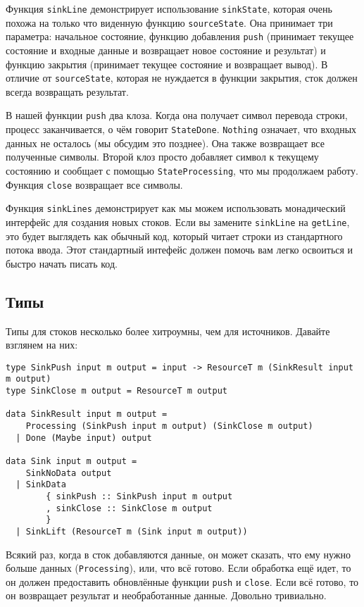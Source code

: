 {Функция \lstinline=sinkLine= демонстрирует использование \lstinline=sinkState=, которая
очень похожа на только что
виденную функцию \lstinline=sourceState=. Она принимает три параметра: начальное
состояние,
функцию добавления \verb=push= 
(принимает текущее состояние и входные данные и возвращает новое состояние и результат)
и функцию закрытия (принимает текущее состояние и возвращает вывод).
В отличие от \lstinline=sourceState=, которая не нуждается в функции закрытия, сток
должен всегда возвращать результат.

В нашей функции \lstinline=push= два клоза. Когда она получает символ перевода строки,
процесс заканчивается, о чём говорит \lstinline=StateDone=. \lstinline=Nothing= означает,
что
входных данных не
осталось (мы обсудим это позднее). Она также возвращает все полученные символы. Второй
клоз просто добавляет символ к текущему состоянию и сообщает с помощью
\lstinline=StateProcessing=, что мы продолжаем работу.
Функция \lstinline=close= возвращает все символы.

Функция \lstinline=sinkLines= демонстрирует как мы можем использовать монадический
интерфейс для создания новых стоков. Если вы замените \lstinline=sinkLine= на
\lstinline=getLine=, это будет выглядеть
как обычный код, который читает строки из стандартного потока ввода. Этот
стандартный интефейс должен помочь вам легко освоиться и быстро начать писать код.

\subsection{Типы}

Типы для стоков несколько более хитроумны, чем для источников. Давайте взглянем на них:
\begin{lstlisting}
type SinkPush input m output = input -> ResourceT m (SinkResult input m output)
type SinkClose m output = ResourceT m output

data SinkResult input m output =
    Processing (SinkPush input m output) (SinkClose m output)
  | Done (Maybe input) output

data Sink input m output =
    SinkNoData output
  | SinkData
        { sinkPush :: SinkPush input m output
        , sinkClose :: SinkClose m output
        }
  | SinkLift (ResourceT m (Sink input m output))
\end{lstlisting}  
Всякий раз, когда в сток добавляются данные, он может сказать, что ему нужно больше
данных (\lstinline{Processing}), или, что всё готово. Если обработка ещё идет, то он должен предоставить
обновлённые функции \lstinline{push} и \lstinline{close}. Если всё готово, то он возвращает результат и
необработанные данные. Довольно тривиально.
 
}
